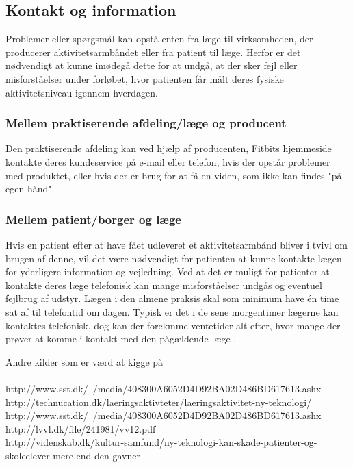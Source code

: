 \subsection{Kontakt og information}
Problemer eller spørgsmål kan opstå enten fra læge til virksomheden, der producerer aktivitetsarmbåndet eller fra patient til læge. Herfor er det nødvendigt at kunne imødegå dette for at undgå, at der sker fejl eller misforståelser under forløbet, hvor patienten får målt deres fysiske aktivitetsniveau igennem hverdagen. 

\subsubsection{Mellem praktiserende afdeling/læge og producent}
Den praktiserende afdeling kan ved hjælp af producenten, Fitbits hjemmeside kontakte deres kundeservice på e-mail eller telefon, hvis der opstår problemer med produktet, eller hvis der er brug for at få en viden, som ikke kan findes "på egen hånd". 

\subsubsection{Mellem patient/borger og læge}
Hvis en patient efter at have fået udleveret et aktivitetsarmbånd bliver i tvivl om brugen af denne, vil det være nødvendigt for patienten at kunne kontakte lægen for yderligere information og vejledning. Ved at det er muligt for patienter at kontakte deres læge telefonisk kan mange misforståelser undgås og eventuel fejlbrug af udstyr. Lægen i den almene praksis skal som minimum have én time sat af til telefontid om dagen. Typisk er det i de sene morgentimer lægerne kan kontaktes telefonisk, dog kan der forekmme ventetider alt efter, hvor mange der prøver at komme i kontakt med den pågældende læge \citep{vedsted2005}. 


Andre kilder som er værd at kigge på \\\\

http://www.sst.dk/~/media/408300A6052D4D92BA02D486BD617613.ashx \\
http://technucation.dk/laeringsaktivteter/laeringsaktivitet-ny-teknologi/ \\
http://www.sst.dk/~/media/408300A6052D4D92BA02D486BD617613.ashx \\
http://lvvl.dk/file/241981/vv12.pdf \\

http://videnskab.dk/kultur-samfund/ny-teknologi-kan-skade-patienter-og-skoleelever-mere-end-den-gavner

